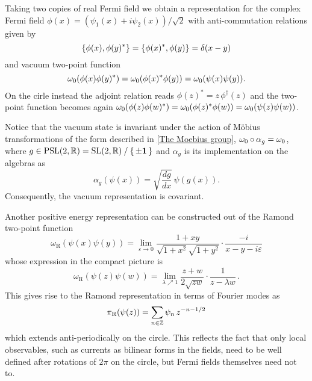  \bigskip
 Taking two copies of real Fermi field we obtain a
 representation for the complex Fermi field 
 $\phi(x)=\left(\psi_1(x)+i\psi_2(x)\right)/\sqrt{2}$
 with anti-commutation relations given by
 \[
 \{\phi(x),\phi(y)^*\}=\{\phi(x)^*,\phi(y)\}=
 \delta(x-y)
 \]
 and vacuum two-point function 
 \[
 \omega_0(\phi(x)\phi(y)^*)=
 \omega_0(\phi(x)^*\phi(y))=\omega_0(\psi(x)\psi(y)).
 \]
 On the cirle instead the adjoint relation reads 
 $\phi(z)^*=z\,\phi^{\dagger}(z)$
 and the two-point function becomes again $\omega_0(\phi(z)\phi(w)^*)=
 \omega_0(\phi(z)^*\phi(w))=\omega_0(\psi(z)\psi(w))$. 
 
 \bigskip
 Notice that the vacuum state is invariant under the action
 of M\"obius transformations of the form described in
 \ref{The Moebius group}, $\omega_0\circ \alpha_g=\omega_0$, where 
 $g\in\textrm{PSL}(2,\mathbb{R})= \textrm{SL}(2,\mathbb{R})\mathbin/\set{\pm\bm{1}}$ 
 and $\alpha_g$ is its implementation on the algebras as
 \[
 \alpha_g(\psi(x))=\sqrt{\frac{dg}{dx}}\,\psi(g(x)).
 \]
 Consequently, the vacuum representation is covariant.
 
 \bigskip
 Another positive energy representation can be constructed
 out of the Ramond two-point function
 \begin{equation}
 \label{Ramond}
 \omega_{\textrm{R}}(\psi(x)\psi(y))=
 \lim_{\varepsilon\to 0}\frac{1+xy}{\sqrt{1+x^2}\sqrt{1+y^2}}
 \cdot\frac{-i}{x-y-i\varepsilon}
 \end{equation}
 whose expression in the compact picture is
 \[
 \omega_{\textrm{R}}(\psi(z)\psi(w))=\lim_{\lambda\nearrow 1}
 \frac{z+w}{2\sqrt{zw}}\cdot\frac{1}{z-\lambda w}\,.
 \]
 This gives rise to the Ramond representation in terms
 of Fourier modes as
 \[
 \pi_{\textrm{R}}(\psi(z))=\sum_{n\in\mathbb{Z}}\psi_n \,z^{-n-1/2}
 \]
 which extends anti-periodically on the circle. This 
 reflects the fact that only local observables, such
 as currents as bilinear forms in the fields, need 
 to be well defined after rotations of $2\pi$ on the
 circle, but Fermi fields themselves need not to.
 
 

